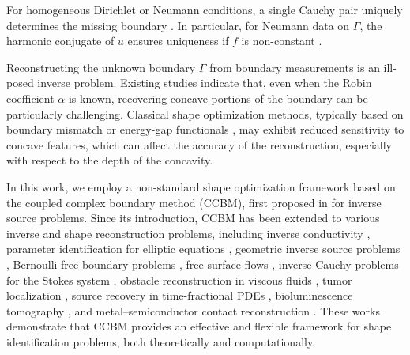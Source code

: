 \documentclass[a4paper,11pt]{article}
\begin{document}
For homogeneous Dirichlet or Neumann conditions, a single Cauchy pair uniquely determines the missing boundary \cite[Thm. 2.3]{CakoniKress2007}. 
In particular, for Neumann data on $\varGamma$, the harmonic conjugate of $u$ ensures uniqueness if $f$ is non-constant \cite[Rem. 2.4]{CakoniKress2007}.

Reconstructing the unknown boundary $\varGamma$ from boundary measurements is an ill-posed inverse problem. 
Existing studies \cite{AfraitesRabago2025,RabagoAzegami2018,CaubetDambrineKateb2013} indicate that, even when the Robin coefficient $\alpha$ is known, recovering concave portions of the boundary can be particularly challenging. Classical shape optimization methods, typically based on boundary mismatch or energy-gap functionals \cite{AfraitesRabago2025,RabagoAzegami2018,CaubetDambrineKateb2013,Fang2022}, may exhibit reduced sensitivity to concave features, which can affect the accuracy of the reconstruction, especially with respect to the depth of the concavity.


In this work, we employ a non-standard shape optimization framework based on the coupled complex boundary method (CCBM), first proposed in \cite{Chengetal2014} for inverse source problems. Since its introduction, CCBM has been extended to various inverse and shape reconstruction problems, including inverse conductivity \cite{Gongetal2017}, parameter identification for elliptic equations \cite{ZhengChengGong2020}, geometric inverse source problems \cite{Afraites2022,AfraitesMasnaouiNachaoui2022}, Bernoulli free boundary problems \cite{Rabago2023b}, free surface flows \cite{RabagoNotsu2024}, inverse Cauchy problems for the Stokes system \cite{Ouiassaetal2022}, obstacle reconstruction in viscous fluids \cite{RabagoAfraitesNotsu2025}, tumor localization \cite{Rabago2025}, source recovery in time-fractional PDEs \cite{HriziPrakashNovotny2025}, bioluminescence tomography \cite{WuGongGongZhangZhu2026}, and metal--semiconductor contact reconstruction \cite{AfraitesHadriHriziRabago2026}. These works demonstrate that CCBM provides an effective and flexible framework for shape identification problems, both theoretically and computationally.
\end{document}
